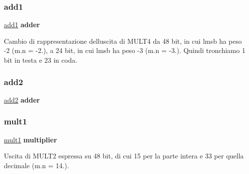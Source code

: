 \subsubsection{\texorpdfstring{add1}{add1}}
{\footnotesize\ttfamily \hyperlink{class_linear_regression_1_1_structural_adea88291834bfbc1cfe284774c792d37}{add1} {\bfseries \textcolor{vhdlchar}{adder}\textcolor{vhdlchar}{ }} \hspace{0.3cm}{\ttfamily [Instantiation]}}

Cambio di rappresentazione dell\textquotesingle{}uscita di M\+U\+L\+T4 da 48 bit, in cui l\textquotesingle{}msb ha peso -\/2 (m.\+n = -\/2.), a 24 bit, in cui l\textquotesingle{}msb ha peso -\/3 (m.\+n = -\/3.). Quindi tronchiamo 1 bit in testa e 23 in coda. \mbox{\label{class_linear_regression_1_1_structural_a09e3b860880a85f376374594ffd092fb}} 
\subsubsection{\texorpdfstring{add2}{add2}}
{\footnotesize\ttfamily \hyperlink{class_linear_regression_1_1_structural_a09e3b860880a85f376374594ffd092fb}{add2} {\bfseries \textcolor{vhdlchar}{adder}\textcolor{vhdlchar}{ }} \hspace{0.3cm}{\ttfamily [Instantiation]}}

\mbox{\label{class_linear_regression_1_1_structural_abe2dbada52541335e367815bffe06c28}} 
\subsubsection{\texorpdfstring{mult1}{mult1}}
{\footnotesize\ttfamily \hyperlink{class_linear_regression_1_1_structural_abe2dbada52541335e367815bffe06c28}{mult1} {\bfseries \textcolor{vhdlchar}{multiplier}\textcolor{vhdlchar}{ }} \hspace{0.3cm}{\ttfamily [Instantiation]}}

Uscita di M\+U\+L\+T2 espressa su 48 bit, di cui 15 per la parte intera e 33 per quella decimale (m.\+n = 14.). \mbox{\label{class_linear_regression_1_1_structural_a7c5c7b6fb03b66e49b0eb767162f01a8}} 
